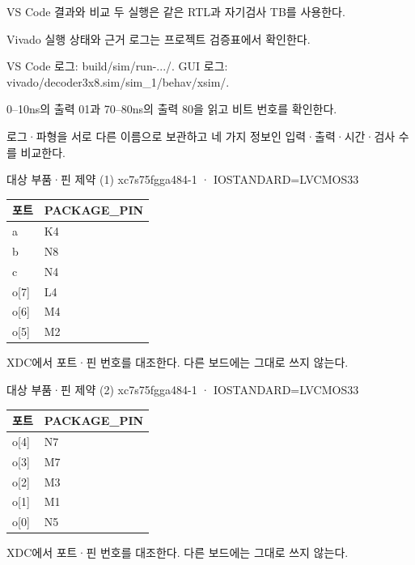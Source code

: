 \begin{frame}{VS Code 결과와 비교}\relax
\small
두 실행은 같은 RTL과 자기검사 TB를 사용한다.\par\vspace{0.22cm}Vivado 실행 상태와 근거 로그는 프로젝트 검증표에서 확인한다.\par\vspace{0.22cm}VS Code 로그: build/sim/run-.../. GUI 로그: vivado/decoder3x8.sim/sim\_1/behav/xsim/.\par\vspace{0.22cm}0–10ns의 출력 01과 70–80ns의 출력 80을 읽고 비트 번호를 확인한다.\par\vspace{0.22cm}로그·파형을 서로 다른 이름으로 보관하고 네 가지 정보인 입력·출력·시간·검사 수를 비교한다.\par
\end{frame}

\begin{frame}{대상 부품·핀 제약 (1)}\relax
\small
xc7s75fgga484-1 · IOSTANDARD=LVCMOS33\par\begin{center}\renewcommand{\arraystretch}{1.45}
\begin{tabular}{l|l}
포트 & PACKAGE\_PIN\\\hline
a & K4\\
b & N8\\
c & N4\\
o[7] & L4\\
o[6] & M4\\
o[5] & M2\\
\end{tabular}\end{center}
XDC에서 포트·핀 번호를 대조한다. 다른 보드에는 그대로 쓰지 않는다.\par
\end{frame}

\begin{frame}{대상 부품·핀 제약 (2)}\relax
\small
xc7s75fgga484-1 · IOSTANDARD=LVCMOS33\par\begin{center}\renewcommand{\arraystretch}{1.45}
\begin{tabular}{l|l}
포트 & PACKAGE\_PIN\\\hline
o[4] & N7\\
o[3] & M7\\
o[2] & M3\\
o[1] & M1\\
o[0] & N5\\
\end{tabular}\end{center}
XDC에서 포트·핀 번호를 대조한다. 다른 보드에는 그대로 쓰지 않는다.\par
\end{frame}

